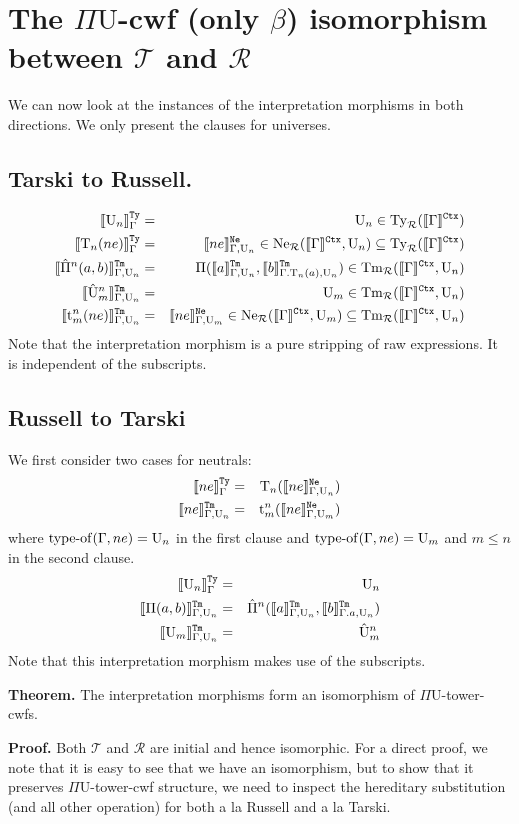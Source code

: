\documentclass{lmcs}
\def\UU{\mathrm{U}}
\def\Ta{\mathrm{T}}
\def\Pihat{\hat{\Pi}}
\def\UUhat{\hat{\UU}}
\def\t{\mathrm{t}}
\def\RawNe{\texttt{Ne}}
\def\Ty{\mathrm{Ty}}
\def\Tm{\mathrm{Tm}}
\def\Ne{\mathrm{Ne}}
\def\T{\mathcal{T}}
\def\R{\mathcal{R}}
\newcommand{\intCtxU}[1]{\llbracket #1 \rrbracket^\RawCtx}
\newcommand{\intTyU}[1]{\llbracket #1 \rrbracket^\RawTy}
\newcommand{\intTmU}[1]{\llbracket #1 \rrbracket^\RawTm}
\newcommand{\intNeU}[1]{\llbracket #1 \rrbracket^\RawNe}
\begin{document}
\section{The $\Pi\UU$-cwf (only $\beta$) isomorphism between $\T$ and $\R$}

We can now look at the instances of the interpretation morphisms in both directions.
We only present the clauses for universes.

\subsection{Tarski to Russell.} 
\begin{eqnarray*}
\intTyU{\UU_n}_\Gamma &=& \UU_n \in \Ty_\R(\intCtxU{\Gamma})\\
\intTyU{\Ta_n(ne)}_\Gamma &=& \intNeU{ne}_{\Gamma,\UU_n}\in 
\Ne_\R(\intCtxU{\Gamma},\UU_n) \subseteq \Ty_\R(\intCtxU{\Gamma})\\
\intTmU{\Pihat^n(a,b)}_{\Gamma,\UU_n}
&=& \Pi(\intTmU{a}_{\Gamma,\UU_n},\intTmU{b}_{\Gamma.\Ta_n(a),\UU_n})
\in \Tm_\R(\intCtxU{\Gamma},\UU_n)\\
\intTmU{\UUhat^n_m}_{\Gamma,\UU_n} &=& \UU_m \in \Tm_\R(\intCtxU{\Gamma},\UU_n)\\
\intTmU{\t^n_m(ne)}_{\Gamma,\UU_n} &=& 
\intNeU{ne}_{\Gamma,\UU_{m}} \in \Ne_\R(\intCtxU{\Gamma},\UU_{m}) \subseteq \Tm_\R(\intCtxU{\Gamma},\UU_n)
\end{eqnarray*}
Note that the interpretation morphism is a pure stripping of raw expressions. It is independent of the subscripts.

\subsection{Russell to Tarski} 

We first consider two cases for neutrals:
\begin{eqnarray*}
\intTyU{ne}_\Gamma &=& \Ta_n(\intNeU{ne}_{\Gamma,\UU_n})\\
\intTmU{ne}_{\Gamma,\UU_{n}} &=& 
\t_m^n(\intNeU{ne}_{\Gamma,\UU_m})
\end{eqnarray*}
where $\typeof(\Gamma,ne) = \UU_n$ in the first clause and $\typeof(\Gamma,ne) = \UU_m$ and $m \leq n$ in the second clause. 
\begin{eqnarray*}
\intTyU{\UU_n}_\Gamma &=& \UU_n\\ 
\intTmU{\Pi(a,b)}_{\Gamma,\UU_n}&=& \Pihat^n(\intTmU{a}_{\Gamma,\UU_n},\intTmU{b}_{\Gamma.a,\UU_n})\\
\intTmU{\UU_m}_{\Gamma,\UU_{n}} &=& \UUhat_m^n
\end{eqnarray*}
Note that this interpretation morphism makes use of the subscripts.

{\bf Theorem.} The interpretation morphisms form an isomorphism of $\Pi\UU$-tower-cwfs.

{\bf Proof.} Both $\T$ and $\R$ are initial and hence isomorphic. For a direct proof, we note that it is easy to see that we have an isomorphism, but to show that it preserves $\Pi\UU$-tower-cwf structure, we need to inspect the hereditary substitution (and all other operation) for both a la Russell and a la Tarski.



\end{document}
